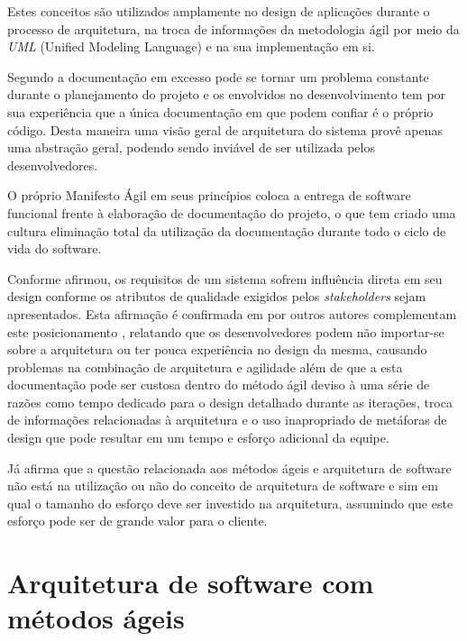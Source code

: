 Estes conceitos são utilizados amplamente no design de aplicações durante o processo de arquitetura, na troca de informações da metodologia ágil por meio da \textit{UML} (Unified Modeling Language) e na sua implementação em si.  

Segundo \cite{highsmith2001agile} a documentação em excesso pode se tornar um problema constante durante o planejamento do projeto e os envolvidos no desenvolvimento tem por sua experiência que a única documentação em que podem confiar é o próprio código. Desta maneira uma visão geral de arquitetura do sistema provê apenas uma abstração geral, podendo sendo inviável de ser utilizada pelos desenvolvedores.

O próprio Manifesto Ágil \cite{manifestoagil} em seus princípios coloca a entrega de software funcional frente à elaboração de documentação do projeto, o que tem criado uma cultura eliminação total da utilização da documentação durante todo o ciclo de vida do software.

Conforme \cite{bass2007software} afirmou, os requisitos de um sistema sofrem influência direta em seu design conforme os atributos de qualidade exigidos pelos \textit{stakeholders} sejam apresentados. Esta afirmação é confirmada em por outros autores complementam este posicionamento \cite{prause2012architectural}, relatando que os desenvolvedores podem não importar-se sobre a arquitetura ou ter pouca experiência no design da mesma, causando problemas na combinação de arquitetura e agilidade além de que a esta documentação pode ser custosa dentro do método ágil deviso à uma série de razões como tempo dedicado para o design detalhado durante as iterações, troca de informações relacionadas à arquitetura e o uso inapropriado de metáforas de design que pode resultar em um tempo e esforço adicional da equipe.

Já \cite{cockburn2006agile} afirma que a questão relacionada aos métodos ágeis e arquitetura de software não está na utilização ou não do conceito de arquitetura de software e sim em qual o tamanho do esforço deve ser investido na arquitetura, assumindo que este esforço pode ser de grande valor para o cliente.

\section{Arquitetura de software com métodos ágeis}


